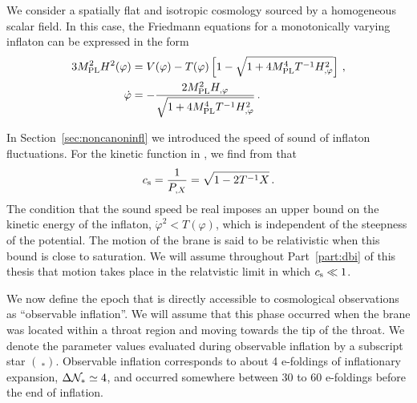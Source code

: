 We consider a spatially flat and isotropic cosmology 
sourced by a homogeneous scalar field. 
In this case, the Friedmann equations for a monotonically 
varying inflaton can be expressed in the form \cite{brane6} 
% 
\begin{align}
\label{eq:Friedmann-dbiintro}
3 M_{\mathrm{PL}}^2 H^2(\varphi ) &= V(\varphi ) -T(\varphi ) 
\left[ 1- \sqrt{1+4M_{\mathrm{PL}}^4T^{-1} H_{,\varphi}^2} \right] \,,\\
\label{eq:phidot-useful}
\dot{\varphi} &= - \frac{2M_{\mathrm{PL}}^2H_{,\varphi}}{\sqrt{1+4M_{\mathrm{PL}}^4 T^{-1} H_{,\varphi}^2}}
\,.
\end{align}
% 

In Section~\ref{sec:noncanoninfl} we introduced the speed of sound of
inflaton fluctuations. For the kinetic function in
, we find from
 that
% 
\begin{equation}
\label{eq:csdefn-dbiintro}
c_\mathrm{s} = \frac{1}{P_{,X}} = \sqrt{1 -2T^{-1}X}  \,.
\end{equation}
% 
The condition that the sound speed be real 
imposes an upper bound on the kinetic energy 
of the inflaton, $\dot{\varphi}^2 < T(\varphi)$, which 
is independent of the steepness of the potential.
The motion of the brane is said to be relativistic when this bound is 
close to saturation. We will assume throughout Part~\ref{part:dbi} of this thesis that motion takes
place in the relatvistic limit in which $c_\mathrm{s}\ll1$. 
 
We now define the epoch that is directly 
accessible to cosmological observations as ``observable inflation''. 
We will assume that this phase 
occurred when the brane was located within a 
throat region and moving towards the tip of the throat. 
We denote the parameter values 
evaluated during observable inflation by a subscript star
$(~_*)$. Observable inflation corresponds to about 4 e-foldings  
of inflationary expansion, $\Delta \mathcal{N}_* \simeq 4$,
and occurred somewhere between 30 to 60 e-foldings before the
end of inflation. 


